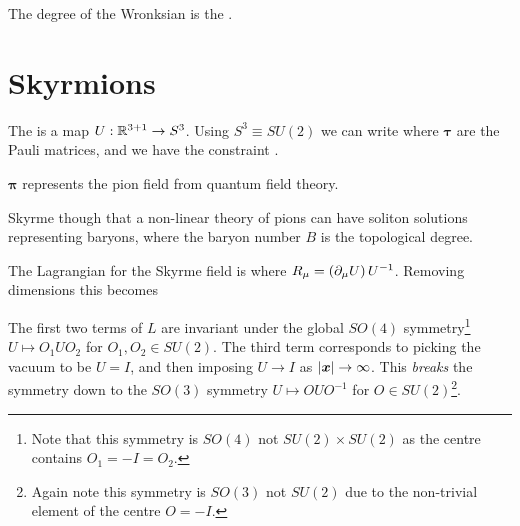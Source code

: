 \documentclass{article}
\begin{document}
\begin{prop}
The degree of the Wronksian is the . 
\end{prop}

\section{Skyrmions}

\begin{definition}
The  is a map $U : \mathbb{R}^{3+1} \to S^3$. Using $S^3 \equiv SU(2)$ we can write 
where $\bm{\tau}$ are the Pauli matrices, and we have the constraint 
. 
\end{definition}

\begin{fact}
$\bm{\pi}$ represents the pion field from quantum field theory. 
\end{fact}

\begin{idea}
Skyrme though that a non-linear theory of pions can have soliton solutions representing baryons, where the baryon number $B$ is the topological degree. 
\end{idea}

\begin{definition}
The Lagrangian for the Skyrme field is 
where $R_\mu = \left( \partial_\mu U \right) U^{-1}$. Removing dimensions this becomes 
\end{definition}

The first two terms of $L$ are invariant under the global $SO(4)$ symmetry\footnote{Note that this symmetry is $SO(4)$ not $SU(2) \times SU(2)$ as the centre contains $O_1 = -I = O_2$. } $U \mapsto O_1 U O_2$ for $O_1, O_2 \in SU(2)$. The third term corresponds to picking the vacuum to be $U=I$, and then imposing $U\to I$ as $\left\lvert \bm{x} \right\rvert \to \infty$. This \emph{breaks} the symmetry down to the $SO(3)$ symmetry $U \mapsto O U O^{-1}$ for $O \in SU(2)$\footnote{Again note this symmetry is $SO(3)$ not $SU(2)$ due to the non-trivial element of the centre $O = -I$.}.
\end{document}
